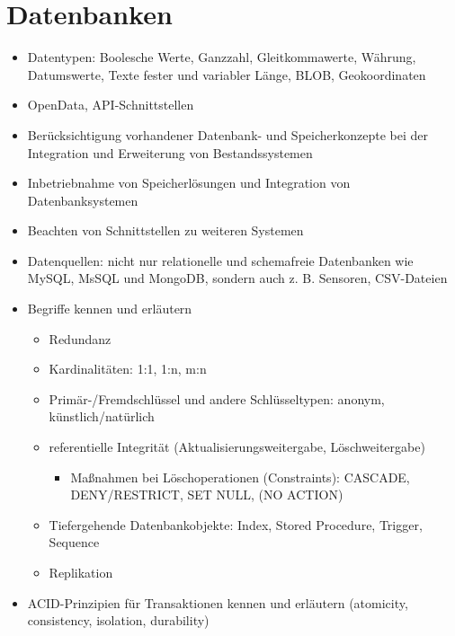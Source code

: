 \section{Datenbanken}
\label{sec:Datenbanken}

\begin{itemize}[noitemsep]
	\item Datentypen: Boolesche Werte, Ganzzahl, Gleitkommawerte, Währung, Datumswerte, Texte fester und variabler Länge, BLOB, Geokoordinaten
	\item OpenData, API-Schnittstellen
	\item Berücksichtigung vorhandener Datenbank- und Speicherkonzepte bei der Integration und Erweiterung von Bestandssystemen
	\item Inbetriebnahme von Speicherlösungen und Integration von Datenbanksystemen
	\item Beachten von Schnittstellen zu weiteren Systemen
	\item Datenquellen: nicht nur relationelle und schemafreie Datenbanken wie MySQL, MsSQL und MongoDB, sondern auch z. B. Sensoren, CSV-Dateien
	\item Begriffe kennen und erläutern
	\begin{itemize}[noitemsep]
		\item Redundanz
		\item Kardinalitäten: 1:1, 1:n, m:n
		\item Primär-/Fremdschlüssel und andere Schlüsseltypen: anonym, künstlich/natürlich
		\item referentielle Integrität (Aktualisierungsweitergabe, Löschweitergabe)
		\begin{itemize}[noitemsep]
			\item Maßnahmen bei Löschoperationen (Constraints): CASCADE, DENY/RESTRICT, SET NULL, (NO ACTION)
		\end{itemize}
		\item Tiefergehende Datenbankobjekte: Index, Stored Procedure, Trigger, Sequence
		\item Replikation
	\end{itemize}
	\item ACID-Prinzipien für Transaktionen kennen und erläutern (atomicity, consistency, isolation, durability)
\end{itemize}





